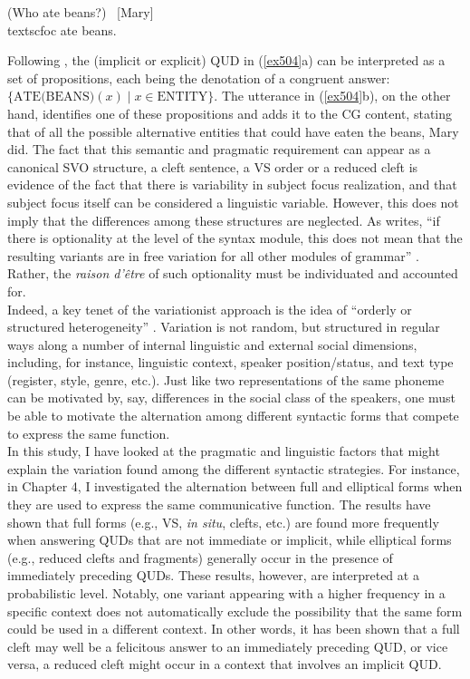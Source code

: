 \ea \label{ex504} 
\ea (Who ate beans?)
\ex \ [Mary]\\textsc{foc} \normalsize ate beans. \hfill \parencite[7]{velleman2016question}    
\z \z

Following \textcite{hamblin1976questions}, the (implicit or explicit) QUD in (\ref{ex504}a) can be interpreted as a set of propositions, each being the denotation of a congruent answer: \( \{ \text{ATE(BEANS)}(x) \mid x \in \text{ENTITY} \} \). The utterance in (\ref{ex504}b), on the other hand,  identifies one of these propositions and adds it to the CG content, stating that of all the possible alternative entities that could have eaten the beans, Mary did. 
The fact that this semantic and pragmatic requirement can appear as a canonical SVO structure, a cleft sentence, a VS order or a reduced cleft is evidence of the fact that there is variability in subject focus realization, and that subject focus itself can be considered a linguistic variable. However, this does not imply that the differences among these structures are neglected. As \textcite{adli2006french} writes, ``if there is optionality at the level of the syntax module, this does not mean that the resulting variants are in free variation for all other modules of grammar” \parencite[198]{adli2006french}. Rather, the \textit{raison d'être} of such optionality must be individuated and accounted for.\\ 
Indeed, a key tenet of the variationist approach is the idea of ``orderly or structured heterogeneity” \parencite[99-100]{weinreich1968empirical}. Variation is not random, but structured in regular ways along a number of internal linguistic and external social dimensions, including, for instance, linguistic context, speaker position/status, and text type (register, style, genre, etc.). 
Just like two representations of the same phoneme can be motivated by, say, differences in the social class of the speakers, one must be able to motivate the alternation among different syntactic forms that compete to express the same function. \\
In this study, I have looked at the pragmatic and linguistic factors that might explain the variation found among the different syntactic strategies. For instance, in Chapter 4, I investigated the alternation between full and elliptical forms when they are used to express the same communicative function. The results have shown that full forms (e.g., VS, \textit{in situ}, clefts, etc.) are found more frequently when answering QUDs that are not immediate or implicit, while elliptical forms (e.g., reduced clefts and fragments) generally occur in the presence of immediately preceding QUDs. These results, however, are interpreted at a probabilistic level. Notably, one variant appearing with a higher frequency in a specific context does not automatically exclude the possibility that the same form could be used in a different context. In other words, it has been shown that a full cleft may well be a felicitous answer to an immediately preceding QUD, or vice versa, a reduced cleft might occur in a context that involves an implicit QUD.\\
